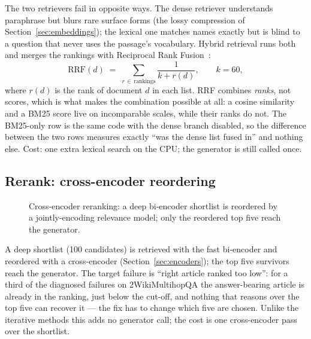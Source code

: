 The two retrievers fail in opposite ways. The dense retriever understands
paraphrase but blurs rare surface forms (the lossy compression of
Section~\ref{sec:embeddings}); the lexical one matches names exactly but is
blind to a question that never uses the passage's vocabulary. Hybrid
retrieval runs both and merges the rankings with Reciprocal Rank
Fusion~\cite{cormack2009rrf}:
\begin{equation}
\mathrm{RRF}(d) \;=\; \sum_{r \,\in\, \text{rankings}} \frac{1}{k + r(d)},
\qquad k = 60,
\label{eq:rrf}
\end{equation}
where $r(d)$ is the rank of document $d$ in each list. RRF combines
\emph{ranks}, not scores, which is what makes the combination possible at
all: a cosine similarity and a BM25 score live on incomparable scales,
while their ranks do not. The BM25-only row is the same code with the dense
branch disabled, so the difference between the two rows measures exactly
``was the dense list fused in'' and nothing else. Cost: one extra lexical
search on the CPU; the generator is still called once.

\subsection{Rerank: cross-encoder reordering}
\label{sec:arch-rerank}

\begin{figure}[t]
\centering
{}
\caption{Cross-encoder reranking: a deep bi-encoder shortlist is reordered
by a jointly-encoding relevance model; only the reordered top five reach
the generator.}
\label{fig:arch-rerank}
\end{figure}

A deep shortlist (100 candidates) is retrieved with the fast bi-encoder and
reordered with a cross-encoder (Section~\ref{sec:encoders}); the top five
survivors reach the generator. The target failure is ``right article
ranked too low'': for a third of the diagnosed failures on 2WikiMultihopQA
the answer-bearing article is already in the ranking, just below the
cut-off, and nothing that reasons over the top five can recover it --- the
fix has to change which five are chosen. Unlike the iterative methods this
adds no generator call; the cost is one cross-encoder pass over the
shortlist.

